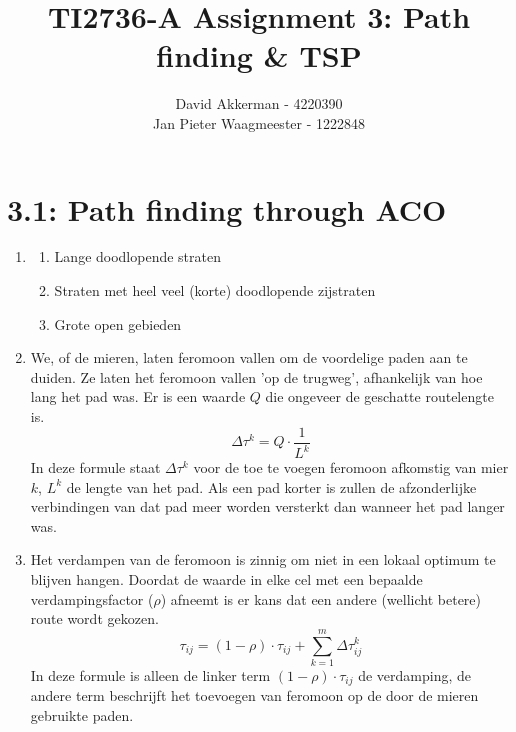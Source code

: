 \documentclass[a4paper,10pt,fleqn]{article}
\title{TI2736-A Assignment 3: Path finding \& TSP}
\author{
    David Akkerman - 4220390 \\
    Jan Pieter Waagmeester - 1222848 \\
}
\begin{document}
\maketitle

\section*{3.1: Path finding through ACO}
\begin{enumerate}[1.]
    \item
        \begin{enumerate}[-]
            \item Lange doodlopende straten
            \item Straten met heel veel (korte) doodlopende zijstraten
            \item Grote open gebieden
        \end{enumerate}


    \item We, of de mieren, laten feromoon vallen om de voordelige paden aan te duiden. Ze laten het feromoon vallen 'op de trugweg', afhankelijk van hoe lang het pad was. Er is een waarde $Q$ die ongeveer de geschatte routelengte is.
    $$\Delta\tau^k = Q \cdot \frac{1}{L^k}$$
    In deze formule staat $\Delta\tau^k$ voor de toe te voegen feromoon afkomstig van mier $k$, $L^k$ de lengte van het pad. Als een pad korter is zullen de afzonderlijke verbindingen van dat pad meer worden versterkt dan wanneer het pad langer was.

    \item Het verdampen van de feromoon is zinnig om niet in een lokaal optimum te blijven hangen. Doordat de waarde in elke cel met een bepaalde verdampingsfactor ($\rho$) afneemt is er kans dat een andere (wellicht betere) route wordt gekozen.
    $$\tau_{ij} = (1 -\rho) \cdot \tau_{ij} + \sum_{k=1}^m \Delta\tau_{ij}^k$$
    In deze formule is alleen de linker term $(1 - \rho) \cdot \tau_{ij}$ de verdamping, de andere term beschrijft het toevoegen van feromoon op de door de mieren gebruikte paden.


\end{enumerate}
\end{document}
